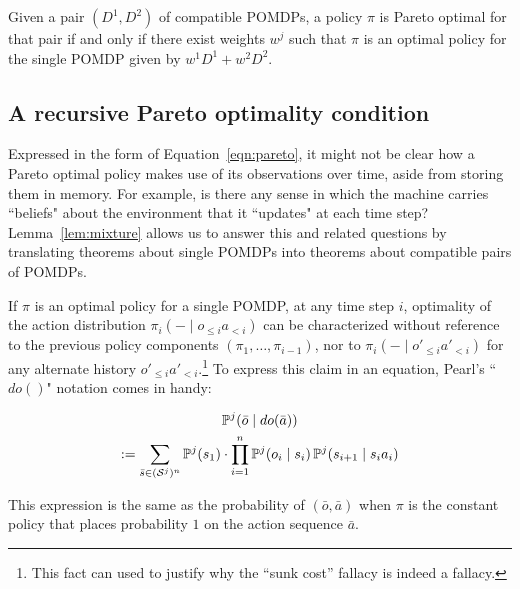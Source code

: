 \documentclass{article}
\newcommand{\seq}{\bar}
\newcommand{\hist}[1]{o_{\le #1}a_{<#1}}
\newcommand{\althist}[1]{o'_{\le #1}a'_{<#1}}
\newcommand{\eqn}[1]{Equation~\ref{eqn:#1}}
\newcommand{\lem}[1]{Lemma~\ref{lem:#1}}
\begin{document}
\begin{lemma}\label{lem:mixture}
Given a pair $(D^1,D^2)$ of compatible POMDPs, a policy $\pi$ is Pareto optimal for that pair if and only if there exist weights $w^j$ such that $\pi$ is an optimal policy for the single POMDP given by $w^1D^1+w^2D^2$.  
\end{lemma}

\subsection{A recursive Pareto optimality condition}

Expressed in the form of \eqn{pareto}, it might not be clear how a Pareto optimal policy makes use of its observations over time, aside from storing them in memory.  For example, is there any sense in which the machine carries ``beliefs" about the environment that it ``updates" at each time step?  \lem{mixture} allows us to answer this and related questions by translating theorems about single POMDPs into theorems about compatible pairs of POMDPs.  

If $\pi$ is an optimal policy for a single POMDP, at any time step $i$, optimality of the action distribution $\pi_i(-\mid\hist{i})$ can be characterized without reference to the previous policy components 
$(\pi_1,\ldots,\pi_{i-1})$, nor to $\pi_i(-\mid\althist{i})$ for any alternate history $\althist{i}$.\footnote{This fact can used to justify why the ``sunk cost'' fallacy is indeed a fallacy.}   To express this claim in an equation, Pearl's ``$do()$" notation \citep{pearl2009causality} comes in handy:
\begin{definition}[``do'' notation]
\begin{multline*}
\PP^j(\seq o \mid do(\seq a)) \\ := \sum_{\seq s \in (\Ss^j)^n} \PP^j(s_1) \cdot \prod_{i=1}^n
\PP^j(o_i \mid s_i)\, \PP^j(s_{i+1} \mid s_ia_i)
\end{multline*}
\end{definition}

This expression is the same as the probability of $(\seq o, \seq a)$ when $\pi$ is the constant policy that places probability $1$ on the action sequence $\seq a$.
\end{document}
